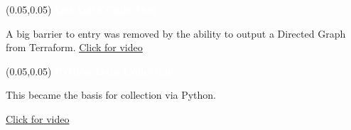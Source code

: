 \documentclass[aspectratio=169]{beamer} %
\begin{document}
\begin{frame}{}
    \setlength{\TPHorizModule}{\textwidth}
    \setlength{\TPVertModule}{\textwidth}
    \begin{textblock}{0.74} (0.05,0.05)
        \bfseries\large\textcolor{white}{Dot Data Collection}
    \end{textblock}
    A big barrier to entry was removed by the ability to output
    a Directed Graph from Terraform. \href{https://youtu.be/2FytVBJHUKk}{Click for video}

    \lstI

\end{frame}

\begin{frame}{}
    \setlength{\TPHorizModule}{\textwidth}
    \setlength{\TPVertModule}{\textwidth}
    \begin{textblock}{0.74} (0.05,0.05)
        \bfseries\large\textcolor{white}{Python Data Collection}
    \end{textblock}
    This became the basis for collection via Python.

    \href{https://youtu.be/aTE8uZVO248}{Click for video} %
\end{frame}
\end{document}
